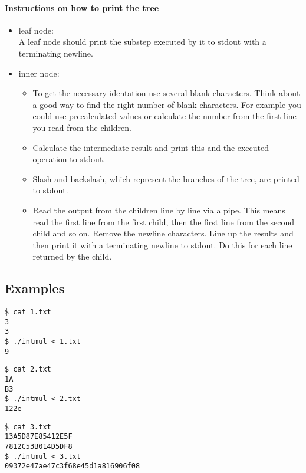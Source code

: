 \paragraph{Instructions on how to print the tree}
\begin{itemize}
	\item leaf node: \\
	A leaf node should print the substep executed by it to stdout with a terminating newline.
	\item inner node: 
	\begin{itemize}
		\item To get the necessary identation use several blank characters. Think about a good way to find the right number of blank characters. For example you could use precalculated values or calculate the number from the first line you read from the children.
		\item Calculate the intermediate result and print this and the executed operation to stdout.
		\item Slash and backslash, which represent the branches of the tree, are printed to stdout.
		\item Read the output from the children line by line via a pipe. This means read the first line from the first child, then the first line from the second child and so on. Remove the newline characters. Line up the results and then print it with a terminating newline to stdout. Do this for each line returned by the child.
	\end{itemize}
\end{itemize}
\subsection*{Examples}
\begin{multicols}{3}
\begin{verbatim}
$ cat 1.txt
3
3
$ ./intmul < 1.txt
9
\end{verbatim}

\begin{verbatim}
$ cat 2.txt
1A
B3
$ ./intmul < 2.txt
122e
\end{verbatim}

\begin{verbatim}
$ cat 3.txt
13A5D87E85412E5F
7812C53B014D5DF8
$ ./intmul < 3.txt
09372e47ae47c3f68e45d1a816906f08
\end{verbatim}
\end{multicols}

\osueguidelinestwo


